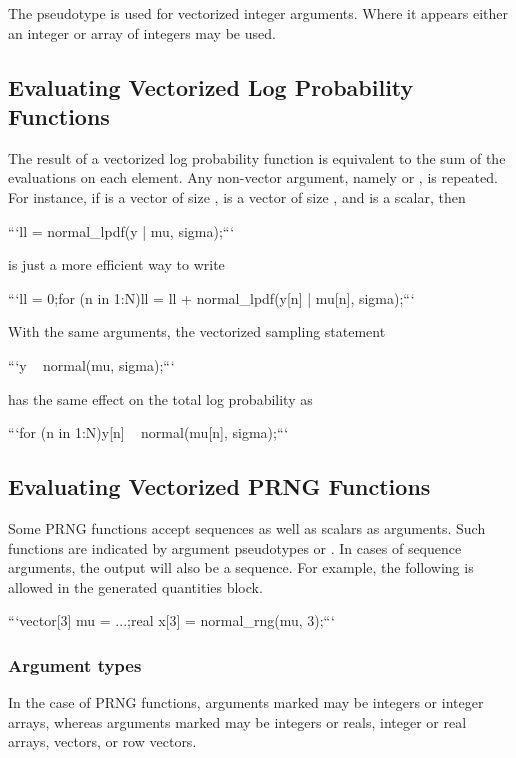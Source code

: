 \begin{description}
{\begin{description}
The pseudotype  is used for vectorized integer arguments. Where it appears either an integer or array of integers may be used.


\subsection{Evaluating Vectorized Log Probability Functions}


The result of a vectorized log probability function is equivalent to the sum of the evaluations on each element.  Any non-vector argument, namely  or , is repeated.  For instance, if  is a vector of size ,  is a vector of size , and  is a scalar, then


```\n ll = normal_lpdf(y | mu, sigma);\n ```


is just a more efficient way to write


```\n ll = 0;\n for (n in 1:N)\n   ll = ll + normal_lpdf(y[n] | mu[n], sigma);\n ```


With the same arguments, the vectorized sampling statement


```\n y ~ normal(mu, sigma);\n ```


has the same effect on the total log probability as


```\n for (n in 1:N)\n   y[n] ~ normal(mu[n], sigma);\n ```


\subsection{Evaluating Vectorized PRNG Functions}\label{prng-vectorization.section}


Some PRNG functions accept sequences as well as scalars as arguments. Such functions are indicated by argument pseudotypes  or .  In cases of sequence arguments, the output will also be a sequence.  For example, the following is allowed in the generated quantities block.


```\n vector[3] mu = ...;\n real x[3] = normal_rng(mu, 3);\n ```


\subsubsection{Argument types}


In the case of PRNG functions, arguments marked  may be integers or integer arrays, whereas arguments marked  may be integers or reals, integer or real arrays, vectors, or row vectors.



\end{description}}
\end{description}
